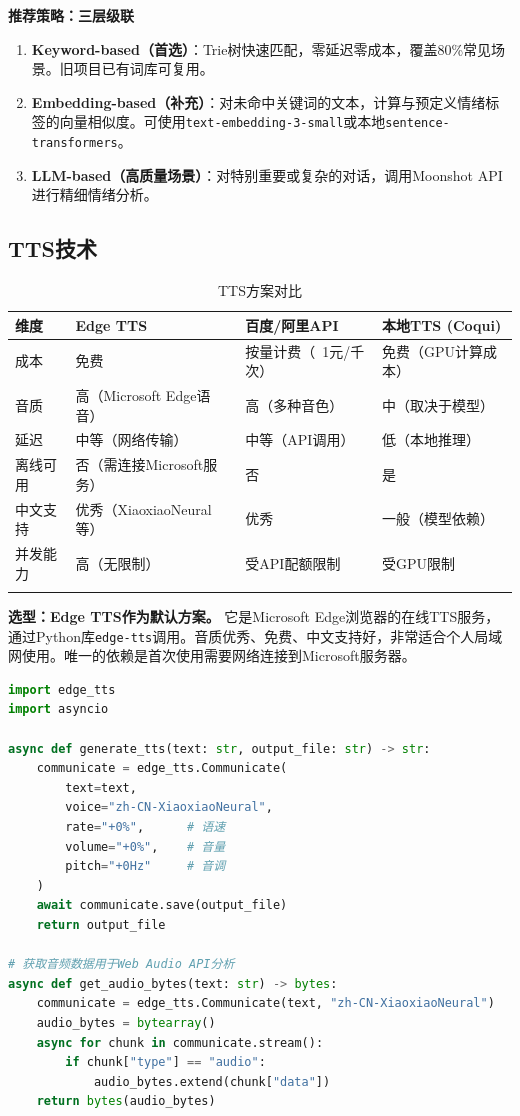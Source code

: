 \documentclass[fontset=mac,a4paper,11pt]{ctexart}
\begin{document}
\textbf{推荐策略：三层级联}
\begin{enumerate}[leftmargin=2em]
\item \textbf{Keyword-based（首选）}：Trie树快速匹配，零延迟零成本，覆盖80\%常见场景。旧项目已有词库可复用。
\item \textbf{Embedding-based（补充）}：对未命中关键词的文本，计算与预定义情绪标签的向量相似度。可使用\texttt{text-embedding-3-small}或本地\texttt{sentence-transformers}。
\item \textbf{LLM-based（高质量场景）}：对特别重要或复杂的对话，调用Moonshot API进行精细情绪分析。
\end{enumerate}

\subsection{TTS技术}

\begin{table}[H]
\centering
\caption{TTS方案对比}
\label{tab:tts}
\begin{tabular}{L{2.5cm}L{3.5cm}L{3.5cm}L{3.5cm}}
\toprule
\textbf{维度} & \textbf{Edge TTS} & \textbf{百度/阿里API} & \textbf{本地TTS (Coqui)} \\
\midrule
{}
成本 & 免费 & 按量计费（~1元/千次） & 免费（GPU计算成本） \\
音质 & 高（Microsoft Edge语音） & 高（多种音色） & 中（取决于模型） \\
延迟 & 中等（网络传输） & 中等（API调用） & 低（本地推理） \\
离线可用 & 否（需连接Microsoft服务） & 否 & 是 \\
中文支持 & 优秀（XiaoxiaoNeural等） & 优秀 & 一般（模型依赖） \\
并发能力 & 高（无限制） & 受API配额限制 & 受GPU限制 \\
\bottomrule
\end{tabular}
\end{table}

\textbf{选型：Edge TTS作为默认方案。} 它是Microsoft Edge浏览器的在线TTS服务，通过Python库\texttt{edge-tts}调用。音质优秀、免费、中文支持好，非常适合个人局域网使用。唯一的依赖是首次使用需要网络连接到Microsoft服务器。

\begin{lstlisting}[language=Python, caption=Edge TTS集成示例]
import edge_tts
import asyncio

async def generate_tts(text: str, output_file: str) -> str:
    communicate = edge_tts.Communicate(
        text=text,
        voice="zh-CN-XiaoxiaoNeural",
        rate="+0%",      # 语速
        volume="+0%",    # 音量
        pitch="+0Hz"     # 音调
    )
    await communicate.save(output_file)
    return output_file

# 获取音频数据用于Web Audio API分析
async def get_audio_bytes(text: str) -> bytes:
    communicate = edge_tts.Communicate(text, "zh-CN-XiaoxiaoNeural")
    audio_bytes = bytearray()
    async for chunk in communicate.stream():
        if chunk["type"] == "audio":
            audio_bytes.extend(chunk["data"])
    return bytes(audio_bytes)
\end{lstlisting}
\end{document}
